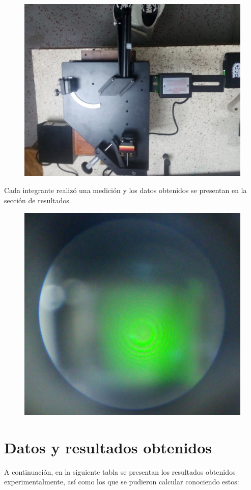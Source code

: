 \documentclass[13,twocolumn,letterpaper]{article}
\begin{document}
  
\begin{figure}[h]
	\centering
\includegraphics[width=\linewidth]{fig4.jpg}
	\label{fig:fig4}
\end{figure}

Cada integrante realizó una medición y los datos obtenidos se presentan en la sección de resultados.\\

\begin{figure}[h]
	\centering
\includegraphics[width=0.8\linewidth]{fig5.jpg}
	\label{fig:fig5}
\end{figure}

\section*{Datos y resultados obtenidos}
A continuación, en la siguiente tabla se presentan los resultados obtenidos experimentalmente, así como los que se pudieron calcular conociendo estos:
\end{document}
